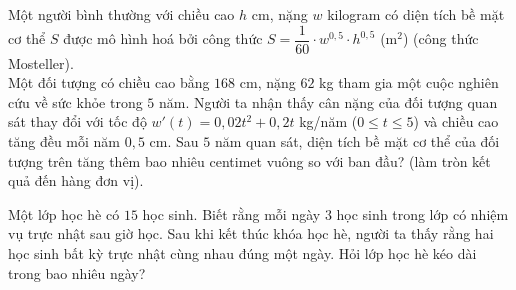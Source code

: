 \begin{ex}%
	Một người bình thường với chiều cao $h$ cm, nặng $w$ kilogram có diện tích bề mặt cơ thể $S$ được mô hình hoá bởi công thức $S=\dfrac{1}{60}\cdot w^{0{,}5}\cdot h^{0{,}5}$ (m$^2$) (công thức Mosteller).\\
	Một đối tượng có chiều cao bằng $168$ cm, nặng $62$ kg tham gia một cuộc nghiên cứu về sức khỏe trong $5$ năm. Người ta nhận thấy cân nặng của đối tượng quan sát thay đổi với tốc độ $w'(t)=0{,}02t^2+0{,}2t$ kg/năm ($0\le t\le 5$) và chiều cao tăng đều mỗi năm $0{,}5$ cm. Sau $5$ năm quan sát, diện tích bề mặt cơ thể của đối tượng trên tăng thêm bao nhiêu centimet vuông so với ban đầu? (làm tròn kết quả đến hàng đơn vị).
\end{ex}

\begin{ex}%
	Một lớp học hè có $15$ học sinh. Biết rằng mỗi ngày $3$ học sinh trong lớp có nhiệm vụ trực nhật sau giờ học. Sau khi kết thúc khóa học hè, người ta thấy rằng hai học sinh bất kỳ trực nhật cùng nhau đúng một ngày. Hỏi lớp học hè kéo dài trong bao nhiêu ngày?
\end{ex}

